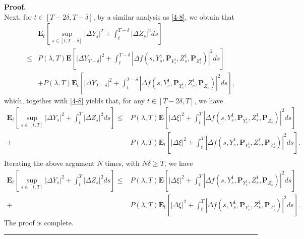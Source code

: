 \documentclass[10pt]{article}%
\numberwithin{equation}{section}
\newenvironment{proof}[1][Proof]{\noindent \textbf{#1.} }{\  \rule{0.5em}{0.5em}}
\def \E{\mathbf{E}}
\def \P{\mathbf{P}}
\begin{document}
\begin{proof}
\begin{equation}
 \end{equation}
 Next, for $t\in[T-2\delta,T-\delta]$, by a similar analysis as \eqref{4-8}, we obtain that 
\begin{equation*}
     \begin{split}\label{4-9}
        &\E_t\left[\sup_{s\in[t,T-\delta]}\left|\Delta Y_s\right|^2+\int_{t}^{T-\delta}\left|\Delta Z_s\right|^2 ds\right]\\
         \leq& P(\lambda,T)\E\left[\left|\Delta Y_{T-\delta}\right|^2+\int_{t}^{T-\delta}\left|\Delta f(s,Y_s^1,\P_{Y_s^1},Z_s^1,\P_{Z_s^1})\right|^2ds\right]\\
         &+ P(\lambda,T)\E_t\left[\left|\Delta Y_{T-\delta}\right|^2+\int_{t}^{T-\delta}\left|\Delta f(s,Y_s^1,\P_{Y_s^1},Z_s^1,\P_{Z_s^1})\right|^2ds\right],
     \end{split}
 \end{equation*}
 which, together with \eqref{4-8} yields that, for any $t\in[T-2\delta, T]$, we have
 \begin{equation*}
     \begin{split}\label{4-10}
        \E_t\left[\sup_{s\in[t,T]}\left|\Delta Y_s\right|^2+\int_{t}^{T}\left|\Delta Z_s\right|^2 ds\right]
         \leq& P(\lambda,T)\E\left[\left|\Delta\xi\right|^2+\int_{t}^{T}\left|\Delta f(s,Y_s^1,\P_{Y_s^1},Z_s^1,\P_{Z_s^1})\right|^2ds\right]\\
         +& P(\lambda,T)\E_t\left[\left|\Delta\xi\right|^2+\int_{t}^{T}\left|\Delta f(s,Y_s^1,\P_{Y_s^1},Z_s^1,\P_{Z_s^1})\right|^2ds\right].\\
     \end{split}
 \end{equation*}
 Iterating the above argument $N$ times, with $N\delta\geq T$, we have 
 \begin{equation*}
     \begin{split}\label{4-11}
        \E_t\left[\sup_{s\in[t,T]}\left|\Delta Y_s\right|^2+\int_{t}^{T}\left|\Delta Z_s\right|^2 ds\right]
         \leq& P(\lambda,T)\E\left[\left|\Delta\xi\right|^2+\int_{t}^{T}\left|\Delta f(s,Y_s^1,\P_{Y_s^1},Z_s^1,\P_{Z_s^1})\right|^2ds\right]\\
         +& P(\lambda,T)\E_t\left[\left|\Delta\xi\right|^2+\int_{t}^{T}\left|\Delta f(s,Y_s^1,\P_{Y_s^1},Z_s^1,\P_{Z_s^1})\right|^2ds\right].
     \end{split}
 \end{equation*}
 The proof is complete.\end{proof}
\end{document}

